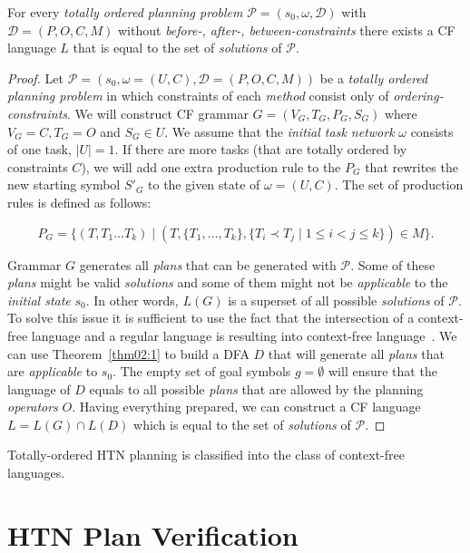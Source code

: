 \begin{thm}\label{thm02:4}
    For every \emph{totally ordered planning problem} $\mathcal{P} = (s_0,\omega,\mathcal{D})$ with $\mathcal{D}=(P, O, C, M)$ without \emph{before-, after-, between-constraints} there exists a CF language $L$ that is equal to the set of \emph{solutions} of $\mathcal{P}$.
\end{thm}
\begin{proof}
    Let $\mathcal{P} = (s_0,\omega = (U, C), \mathcal{D} = (P, O, C, M))$ be a \emph{totally ordered planning problem} in which constraints of each \emph{method} consist only of \emph{ordering-constraints}. We will construct CF grammar $G = (V_G, T_G, P_G, S_G)$ where $V_G = C, T_G = O$ and $S_G \in U$. We assume that the \emph{initial task network} $\omega$ consists of one task, $|U| = 1$. If there are more tasks (that are totally ordered by constraints $C$), we will add one extra production rule to the $P_G$ that rewrites the new starting symbol $S'_G$ to the given state of $\omega = (U, C)$. The set of production rules is defined as follows:
    
    \[
    P_G = \{(T, T_1\dots T_k) \; | \; (T, \{T_1, \dots, T_k\}, \{T_i \prec T_j \; | \; 1 \leq i < j \leq k\}) \in M\}.
    \]

    Grammar $G$ generates all \emph{plans} that can be generated with $\mathcal{P}$. Some of these \emph{plans} might be valid \emph{solutions} and some of them might not be \emph{applicable} to the \emph{initial state} $s_0$. In other words, $L(G)$ is a superset of all possible \emph{solutions} of $\mathcal{P}$. To solve this issue it is sufficient to use the fact that the intersection of a context-free language and a regular language is resulting into context-free language~\cite{chytil}. We can use Theorem~\ref{thm02:1} to build a DFA $D$ that will generate all \emph{plans} that are \emph{applicable} to $s_0$. The empty set of goal symbols $g = \emptyset$ will ensure that the language of $D$ equals to all possible \emph{plans} that are allowed by the planning \emph{operators} $O$. Having everything prepared, we can construct a CF language $L = L(G) \cap L(D)$ which is equal to the set of \emph{solutions} of $\mathcal{P}$.
\end{proof}

\begin{cor}\label{cor2:2}
Totally-ordered HTN planning is classified into the class of context-free languages.
\end{cor}

\section{HTN Plan Verification}

